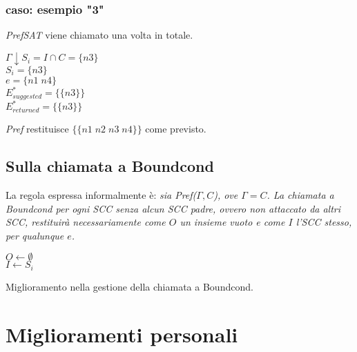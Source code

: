 \subsubsection{caso: esempio "3"}
\emph{PrefSAT} viene chiamato una volta in totale.
\begin{center} 
  	$ \Gamma\downarrow S_i = I \cap C = \{ n3 \}$ \\
  	$ S_i = \{ n3 \}$ \\
  	$ e = \{ n1\;n4\}$ \\
  	$ E^*_{suggested} = \{ \{ n3 \} \}$ \\
  	$ E^*_{returned}  = \{ \{ n3 \} \}$
\end{center} 
\emph{Pref} restituisce $\{ \{n1\;n2\;n3\;n4\} \}$ come previsto. 

\subsection{Sulla chiamata a Boundcond}
La regola espressa informalmente è: \emph{sia Pref($\Gamma, C$), ove $\Gamma=C$.
La chiamata a Boundcond per ogni SCC senza alcun SCC padre, ovvero non attaccato da altri SCC, 
restituirà necessariamente come $O$ un insieme vuoto e come $I$ l'SCC stesso, per
qualunque $e$.} %

\begin{algorithm}
	\SetAlgoLined
	 {
		$O \leftarrow \emptyset$ \\
		$I \leftarrow S_i$
		} 
	\caption{Miglioramento nella gestione della chiamata a Boundcond.}
\end{algorithm}	


\section{Miglioramenti personali}


